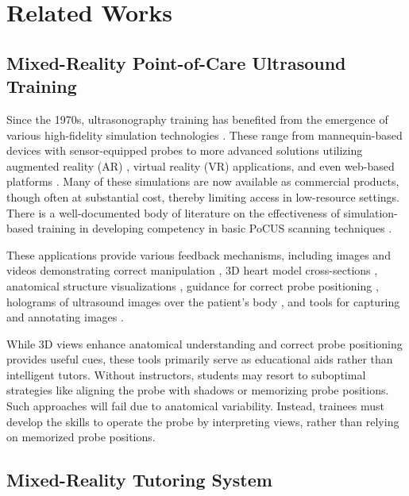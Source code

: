 \section{Related Works}
\subsection{Mixed-Reality Point-of-Care Ultrasound Training}
 Since the 1970s, ultrasonography training has benefited from the emergence of various high-fidelity simulation technologies \cite{parks2013can, mackay2018can, ali2020simulator, kochan2021point, SilvaJournalOE, SituLaCasse2021CanUN, okano2021outcomes}. These range from mannequin-based devices with sensor-equipped probes \cite{sim1, sim2, sim3, vascularsim, okano2021outcomes} to more advanced solutions utilizing augmented reality (AR) \cite{ar1, evans2024product}, virtual reality (VR) \cite{vr1, vr2, vr3annotate} applications, and even web-based platforms \cite{web1, web2, web3phoneinsimo}. Many of these simulations are now available as commercial products, though often at substantial cost, thereby limiting access in low-resource settings. There is a well-documented body of literature on the effectiveness of simulation-based training in developing competency in basic PoCUS scanning techniques \cite{OlivaresPerez2021VirtualAA, parks2013can, mackay2018can, ali2020simulator, kochan2021point, SilvaJournalOE, SituLaCasse2021CanUN}.

These applications provide various feedback mechanisms, including images and videos demonstrating correct manipulation \cite{vascularsim}, 3D heart model cross-sections \cite{sim1, sim2, sim3, web4}, anatomical structure visualizations \cite{vr1, vr2, vr3annotate, sim3, web4}, guidance for correct probe positioning \cite {sim3,web4}, holograms of ultrasound images over the patient's body \cite{ar1}, and tools for capturing and annotating images \cite{vr3annotate}.

While 3D views enhance anatomical understanding and correct probe positioning provides useful cues, these tools primarily serve as educational aids rather than intelligent tutors.  Without instructors, students may resort to suboptimal strategies like aligning the probe with shadows or memorizing probe positions. Such approaches will fail due to anatomical variability. Instead, trainees must develop the skills to operate the probe by interpreting views, rather than relying on memorized probe positions.

\subsection{Mixed-Reality Tutoring System}

